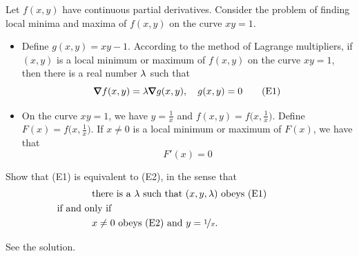 \begin{question}
Let $f(x,y)$ have continuous partial derivatives. Consider the problem of 
finding local minima and maxima of $f(x,y)$ on the curve $xy=1$.
\begin{itemize}
\item
Define $g(x,y) = xy -1$.
According to the method of Lagrange multipliers, if $(x,y)$ is 
a local minimum or maximum of $f(x,y)$ on the curve $xy=1$, then there is a real number $\lambda$ such that
\begin{equation*}
\vnabla f(x,y) =\la \vnabla g(x,y),\quad g(x,y)=0
\tag{E1}\end{equation*}

\item
On the curve $xy=1$, we have 
$y=\frac{1}{x}$ and $f(x,y) =f\big(x,\frac{1}{x}\big)$. Define 
$F(x)=f\big(x,\frac{1}{x}\big)$. If $x\ne 0$ is a local minimum or maximum of 
$F(x)$, we have that
\begin{equation*}
F'(x)=0
\tag{E2}\end{equation*}
\end{itemize}
Show that (E1) is equivalent to (E2), in the sense that 
\begin{align*}
&\text{there is a $\la$ such that $(x,y,\la)$  obeys (E1)}\\
&\hskip-0.5in\text{if and only if}\\ 
&\text{$x\ne 0$ obeys (E2) and $y=\nicefrac{1}{x}$.}
\end{align*}
\end{question}

%

\begin{answer}
See the solution.
\end{answer}

